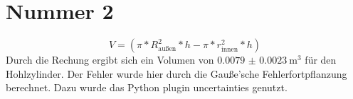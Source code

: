 \section{Nummer 2}
\label{sec:nummer2}

\begin{equation*}
    V = (\pi * R_\text{außen} ^2 * h - \pi * r_\text{innen} ^2 * h)
\end{equation*}
Durch die Rechung ergibt sich ein Volumen von $\SI{0.0079(23)}{\cubic\meter}$ für den Hohlzylinder.
Der Fehler wurde hier durch die Gauße'sche Fehlerfortpflanzung berechnet.
Dazu wurde das Python plugin uncertainties \cite{uncertainties} genutzt.
